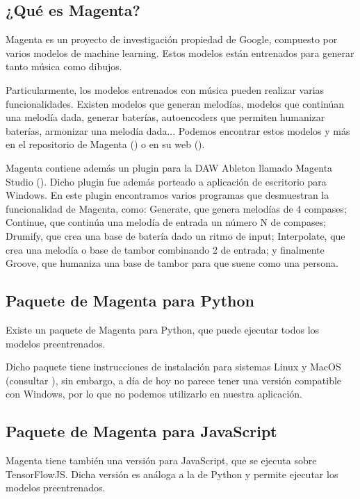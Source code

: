    \subsection{¿Qué es Magenta?}
    \label{subsec:definicionMagenta}
    Magenta es un proyecto de investigación propiedad de Google, compuesto por varios modelos de machine learning. Estos modelos están entrenados para generar tanto música como dibujos.

    Particularmente, los modelos entrenados con música pueden realizar varias funcionalidades. Existen modelos que generan melodías, modelos que continúan una melodía dada, generar baterías, autoencoders que permiten humanizar baterías, armonizar una melodía dada... Podemos encontrar estos modelos y más en el repositorio de Magenta (\cite{MagentaRepo}) o en su web (\cite{MagentaWeb}).

    Magenta contiene además un plugin para la DAW Ableton llamado Magenta Studio (\cite{MagentaStudio}). Dicho plugin fue además porteado a aplicación de escritorio para Windows. En este plugin encontramos varios programas que desmuestran la funcionalidad de Magenta, como: Generate, que genera melodías de 4 compases; Continue, que continúa una melodía de entrada un número N de compases; Drumify, que crea una base de batería dado un ritmo de input; Interpolate, que crea una melodía o base de tambor combinando 2 de entrada; y finalmente Groove, que humaniza una base de tambor para que suene como una persona.
    
    \subsection{Paquete de Magenta para Python}
    \label{subsec:magentaPython}
    Existe un paquete de Magenta para Python, que puede ejecutar todos los modelos preentrenados.

    Dicho paquete tiene instrucciones de instalación para sistemas Linux y MacOS (consultar \cite{MagentaRepo}), sin embargo, a día de hoy no parece tener una versión compatible con Windows, por lo que no podemos utilizarlo en nuestra aplicación.

    \subsection{Paquete de Magenta para JavaScript}
    \label{subsec:magentaJS}
    Magenta tiene también una versión para JavaScript, que se ejecuta sobre TensorFlowJS. Dicha versión es análoga a la de Python y permite ejecutar los modelos preentrenados.

